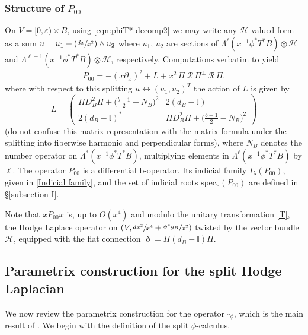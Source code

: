 \documentclass[JEP,XML,SOM,Unicode,NoFloatCountersInSection,published]{cedram}
\newcommand{\Psfrac}[2]{(\sfrac{#1}{#2})}
\theoremstyle{plain}
\theoremstyle{definition}
\newcommand{\calH}{{\mathscr{H}}}
\newcommand{\bb}{{\mathrm{b}}}
\newcommand{\specb}{\mathrm{spec}_\bb}
\let\eps\varepsilon
\begin{document}
\subsubsection*{Structure of $P_{00}$}
On $V = [0,\eps)\times B$, using \eqref{eqn:phiT* decomp2} we may write any $\calH$-valued form as a sum
$u = u_1 + \Psfrac{dx}{x^2}\wedge u_2$ where $u_1$, $u_2$ are sections of $\Lambda^\ell (x^{-1} \phi^*T^*B) \otimes
\mathscr{H}$ and $\Lambda^{\ell-1} (x^{-1} \phi^*T^*B) \otimes
\mathscr{H}$, respectively.
Computations verbatim to \cite[(15)]{guillarmou2014low} yield
\begin{align}\label{indicial-operator-2}
P_{00}
= -(x\partial_x)^{2} + L + x^2 \,\Pi \,\mathscr{R} \,\Pi^\perp \,\mathscr{R} \,\Pi.
\end{align}
where with respect to this splitting $u \leftrightarrow (u_1,u_2)^T$ the action of $L$
is given by
\begin{equation}\label{LL}
L = \left(\begin{array}{cc}
\Pi D^2_{B} \Pi + \bigl(\frac{b-1}2-N_B\bigr)^{2} &2(d_B - \mathbb{I}) \\
2(d_B - \mathbb{I})^* & \Pi D^2_B \Pi + \bigl(\frac{b+1}2-N_B\bigr)^{2}
\end{array} \right)
\end{equation}
(do not confuse this matrix representation with
the matrix formula under the splitting into fiberwise harmonic and perpendicular forms),
where $N_B$ denotes the number opera\-tor on $\Lambda^*(x^{-1} \phi^*T^*B)$,
multiplying elements in $\Lambda^\ell(x^{-1} \phi^*T^*B)$ by $\ell$. The operator
$P_{00}$ is a differential b-operator. Its indicial family $I_\lambda(P_{00})$, given in \eqref{Indicial family},
and the set of indicial roots $\specb(P_{00})$ are defined in \S \ref{subsection-I}.

Note that $xP_{00}x$ is, up to $O(x^4)$ and modulo the unitary transformation \eqref{T}, the Hodge Laplace operator on $(V, \sfrac{dx^2}{x^4}+ \sfrac{\phi^*g_B}{x^2})$ twisted by the vector bundle~$\calH$, equipped with the flat connection $\eth = \Pi(d_{B} - \mathbb{I})\Pi$.

\subsection{Parametrix construction for the split Hodge Laplacian} \label{review grieser-para}
We now review the parametrix construction for the operator $\square_\phi$,
which is the main result of \cite{grieser-para}. We begin with the definition
of the split $\phi$-calculus.
\end{document}
